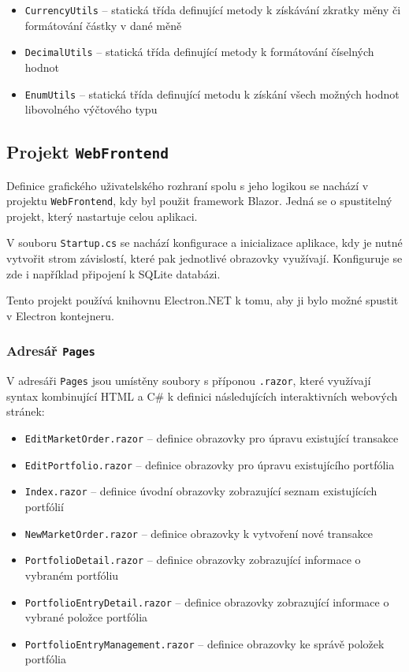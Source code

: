 \documentclass[12pt, a4paper]{article}
\begin{document}
    \begin{itemize}
        \item \texttt{CurrencyUtils} -- statická třída definující metody k získávání zkratky měny či formátování částky v dané měně
        \item \texttt{DecimalUtils} -- statická třída definující metody k formátování číselných hodnot
        \item \texttt{EnumUtils} -- statická třída definující metodu k získání všech možných hodnot libovolného výčtového typu
    \end{itemize}
    
    \subsection{Projekt \texttt{WebFrontend}}
    Definice grafického uživatelského rozhraní spolu s jeho logikou se nachází v projektu \texttt{WebFrontend}, kdy byl
    použit framework Blazor.
    Jedná se o spustitelný projekt, který nastartuje celou aplikaci.
    
    V souboru \texttt{Startup.cs} se nachází konfigurace a inicializace aplikace, kdy je nutné vytvořit strom závislostí,
    které pak jednotlivé obrazovky využívají.
    Konfiguruje se zde i například připojení k SQLite databázi.
    
    Tento projekt používá knihovnu Electron.NET k tomu, aby ji bylo možné spustit v Electron kontejneru. 
    
    \subsubsection{Adresář \texttt{Pages}} 
    V adresáři \texttt{Pages} jsou umístěny soubory s příponou \texttt{.razor}, které využívají syntax kombinující HTML
    a C\# k definici následujících interaktivních webových stránek:
    
    \begin{itemize}
        \item \texttt{EditMarketOrder.razor} -- definice obrazovky pro úpravu existující transakce
        \item \texttt{EditPortfolio.razor} -- definice obrazovky pro úpravu existujícího portfólia
        \item \texttt{Index.razor} -- definice úvodní obrazovky zobrazující seznam existujících portfólií
        \item \texttt{NewMarketOrder.razor} -- definice obrazovky k vytvoření nové transakce
        \item \texttt{PortfolioDetail.razor} -- definice obrazovky zobrazující informace o vybraném portfóliu
        \item \texttt{PortfolioEntryDetail.razor} -- definice obrazovky zobrazující informace o vybrané položce portfólia
        \item \texttt{PortfolioEntryManagement.razor} -- definice obrazovky ke správě položek portfólia
    \end{itemize}
   
\end{document}
